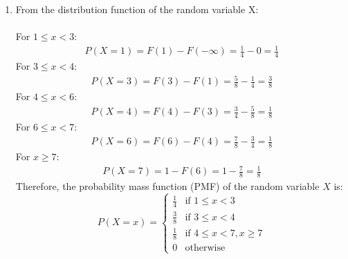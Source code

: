 \documentclass{article}
\begin{document}
\begin{enumerate}
\newpage
\item 
  From the distribution function of the random variable X:\\\\
  For $1 \leq x < 3$:
  \begin{align*}
    P(X = 1) = F(1) - F(-\infty) = \frac{1}{4} - 0 = \frac{1}{4}
  \end{align*}
  For $3 \leq x < 4$:
  \begin{align*}
    P(X = 3) = F(3) - F(1) = \frac{5}{8} - \frac{1}{4} = \frac{3}{8}
  \end{align*}
  For $4 \leq x < 6$:
  \begin{align*}
    P(X = 4) = F(4) - F(3) = \frac{3}{4} - \frac{5}{8} = \frac{1}{8}
  \end{align*}
  For $6 \leq x < 7$:
  \begin{align*}
    P(X = 6) = F(6) - F(4) = \frac{7}{8} - \frac{3}{4} = \frac{1}{8}
  \end{align*}
  For $x \geq 7$:
  \begin{align*}
    P(X = 7) = 1 - F(6) = 1 - \frac{7}{8} = \frac{1}{8}
  \end{align*}
  Therefore, the probability mass function (PMF) of the random variable $X$ is:
  \[ P(X = x) = 
    \begin{cases} 
    \frac{1}{4} & \text{if } 1 \leq x < 3 \\
    \frac{3}{8} & \text{if } 3 \leq x < 4 \\
    \frac{1}{8} & \text{if } 4 \leq x < 7, x \geq 7 \\
    0 & \text{otherwise}
    \end{cases}
  \]
\end{enumerate}
\end{document}
